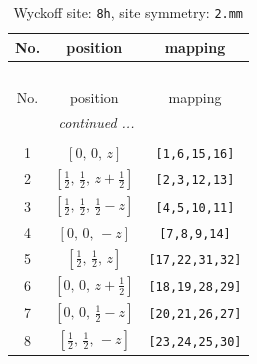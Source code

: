 \documentclass[fleqn,8pt]{jsarticle}
\begin{document}
\begin{longtable}{ccc}
\caption{Wyckoff site: {\tt 8h}, site symmetry: {\tt 2.mm}}
 \\
 \hline \hline
No. & position & mapping \\ \hline \endfirsthead

\multicolumn{2}{l}{\tablename\ \thetable{}} \\
 \hline \hline
No. & position & mapping \\ \hline \endhead

 \hline \hline
\multicolumn{2}{r}{\footnotesize\it continued ...} \\ \endfoot

 \hline \hline
\multicolumn{2}{r}{} \\ \endlastfoot

1 & $\left[ 0,\, 0,\, z \right]$ & {\tt [1,6,15,16]} \\ \hline
2 & $\left[ \frac{1}{2},\, \frac{1}{2},\, z + \frac{1}{2} \right]$ & {\tt [2,3,12,13]} \\ \hline
3 & $\left[ \frac{1}{2},\, \frac{1}{2},\, \frac{1}{2} - z \right]$ & {\tt [4,5,10,11]} \\ \hline
4 & $\left[ 0,\, 0,\, - z \right]$ & {\tt [7,8,9,14]} \\ \hline
5 & $\left[ \frac{1}{2},\, \frac{1}{2},\, z \right]$ & {\tt [17,22,31,32]} \\ \hline
6 & $\left[ 0,\, 0,\, z + \frac{1}{2} \right]$ & {\tt [18,19,28,29]} \\ \hline
7 & $\left[ 0,\, 0,\, \frac{1}{2} - z \right]$ & {\tt [20,21,26,27]} \\ \hline
8 & $\left[ \frac{1}{2},\, \frac{1}{2},\, - z \right]$ & {\tt [23,24,25,30]} \\
\end{longtable}
\renewcommand{\arraystretch}{1.2}
\end{document}

